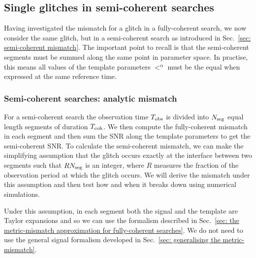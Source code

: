 \documentclass[../full_thesis/full_thesis.tex]{subfiles}
\begin{document}
\subsection{Single glitches in semi-coherent searches}

Having investigated the mismatch for a glitch in a fully-coherent search, we
now consider the same glitch, but in a semi-coherent search as introduced in
Sec.~\ref{sec: semi-coherent mismatch}. The important
point to recall is that the semi-coherent segments must be summed along the
same point in parameter space. In practise, this means all values of the
template parameters $\lt^{\alpha}$ must be the equal when expressed at the same
reference time.

\subsubsection{Semi-coherent searches: analytic mismatch}
\label{sec: semi-coherent searches: analytic mismatch}

For a semi-coherent search the observation time $T_{\mathrm{obs}}$ is
divided into $N_{\textrm{seg}}$ equal length segments of duration $T_{\mathrm{coh}}$. We then compute
the fully-coherent mismatch in each segment and then sum the SNR along the template
parameters to get the semi-coherent SNR. To calculate
the semi-coherent mismatch, we can make the simplifying assumption that the
glitch occurs exactly at the interface between two segments such that $RN_{\textrm{seg}}$
is an integer, where $R$ measures the fraction of the observation period at
which the glitch occurs. We will derive the mismatch under this assumption and
then test how and when it breaks down using numerical simulations.

Under this assumption, in each segment both the signal and the template are
Taylor expansions and so we can use the \citet{Brady1998} formalism described
in Sec.~\ref{sec: the metric-mismatch approximation for fully-coherent
searches}. We do not need to use the general signal formalism developed in
Sec.~\ref{sec: generalising the metric-mismatch}.
\end{document}
